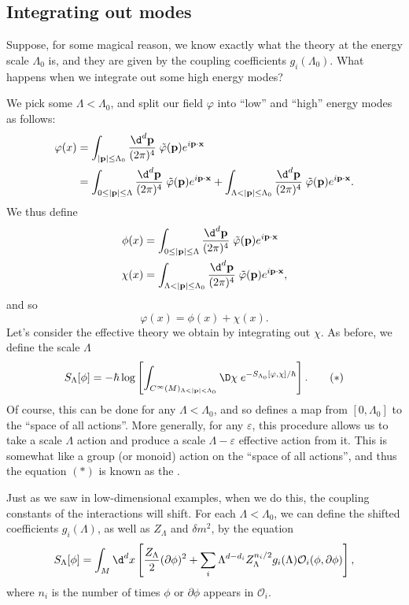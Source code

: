 \documentclass[a4paper]{article}
\begin{document}
\subsection{Integrating out modes}
Suppose, for some magical reason, we know exactly what the theory at the energy scale $\Lambda_0$ is, and they are given by the coupling coefficients $g_i(\Lambda_0)$. What happens when we integrate out some high energy modes?

We pick some $\Lambda < \Lambda_0$, and split our field $\varphi$ into ``low'' and ``high'' energy modes as follows:
\begin{align*}
  \varphi(x) &= \int_{|\mathbf{p}| \leq \Lambda_0} \frac{\d^d \mathbf{p}}{ (2\pi)^4}\;\tilde{\varphi}(\mathbf{p}) e^{i\mathbf{p}\cdot \mathbf{x}}\\
  &= \int_{0 \leq |\mathbf{p}| \leq \Lambda} \frac{\d^d \mathbf{p}}{ (2\pi)^4}\;\tilde{\varphi}(\mathbf{p}) e^{i\mathbf{p}\cdot \mathbf{x}} + \int_{\Lambda < |\mathbf{p}| \leq \Lambda_0} \frac{\d^d \mathbf{p}}{ (2\pi)^4}\;\tilde{\varphi}(\mathbf{p}) e^{i\mathbf{p}\cdot \mathbf{x}}.
\end{align*}
We thus define
\begin{align*}
  \phi(x) &= \int_{0 \leq |\mathbf{p}| \leq \Lambda} \frac{\d^d \mathbf{p}}{ (2\pi)^4}\;\tilde{\varphi}(\mathbf{p}) e^{i\mathbf{p}\cdot \mathbf{x}} \\
  \chi(x) &= \int_{\Lambda < |\mathbf{p}| \leq \Lambda_0} \frac{\d^d \mathbf{p}}{ (2\pi)^4}\;\tilde{\varphi}(\mathbf{p}) e^{i\mathbf{p}\cdot \mathbf{x}},
\end{align*}
and so
\[
  \varphi(x) = \phi(x) + \chi(x).
\]
Let's consider the effective theory we obtain by integrating out $\chi$. As before, we define the scale $\Lambda$ 
\[
  S_\Lambda[\phi] = -\hbar \log \left[\int_{C^\infty(M)_{\Lambda < |\mathbf{p}| < \Lambda_0}} \D \chi\; e^{-S_{\Lambda_0}[\varphi, \chi]/\hbar}\right]. \tag{$*$}
\]
Of course, this can be done for any $\Lambda < \Lambda_0$, and so defines a map from $[0, \Lambda_0]$ to the ``space of all actions''. More generally, for any $\varepsilon$, this procedure allows us to take a scale $\Lambda$ action and produce a scale $\Lambda - \varepsilon$ effective action from it. This is somewhat like a group (or monoid) action on the ``space of all actions'', and thus the equation $(*)$ is known as the .

Just as we saw in low-dimensional examples, when we do this, the coupling constants of the interactions will shift. For each $\Lambda < \Lambda_0$, we can define the shifted coefficients $g_i(\Lambda)$, as well as $Z_\Lambda$ and $\delta m^2$, by the equation
\[
  S_\Lambda[\phi] = \int_M \d^d x \left[\frac{Z_\Lambda}{2} (\partial \phi)^2 + \sum_i \Lambda^{d - d_i} Z_\Lambda^{n_i/2}g_i(\Lambda) \mathcal{O}_i (\phi, \partial \phi)\right],
\]
where $n_i$ is the number of times $\phi$ or $\partial \phi$ appears in $\mathcal{O}_i$.
\end{document}
